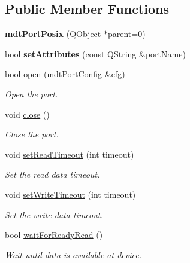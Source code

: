 \subsection*{Public Member Functions}
\begin{DoxyCompactItemize}
\item 
\hypertarget{classmdt_port_posix_ac122e8dde0e224afb3557d29a62de114}{
{\bfseries mdtPortPosix} (QObject $\ast$parent=0)}
\label{classmdt_port_posix_ac122e8dde0e224afb3557d29a62de114}

\item 
\hypertarget{classmdt_port_posix_a32a532f5148226da19ee4acc6ec63201}{
bool {\bfseries setAttributes} (const QString \&portName)}
\label{classmdt_port_posix_a32a532f5148226da19ee4acc6ec63201}

\item 
bool \hyperlink{classmdt_port_posix_aba7e87cb2423bfd61a248cc5d23a8517}{open} (\hyperlink{classmdt_port_config}{mdtPortConfig} \&cfg)
\begin{DoxyCompactList}\small\item\em Open the port. \end{DoxyCompactList}\item 
void \hyperlink{classmdt_port_posix_a778c8d4f6fadd1da725f4287af38f7f0}{close} ()
\begin{DoxyCompactList}\small\item\em Close the port. \end{DoxyCompactList}\item 
void \hyperlink{classmdt_port_posix_a7ab7e4a7dccbd58702f2c37335b900c8}{setReadTimeout} (int timeout)
\begin{DoxyCompactList}\small\item\em Set the read data timeout. \end{DoxyCompactList}\item 
void \hyperlink{classmdt_port_posix_a577a51bf0373f478b32bb1c1e5c4726c}{setWriteTimeout} (int timeout)
\begin{DoxyCompactList}\small\item\em Set the write data timeout. \end{DoxyCompactList}\item 
bool \hyperlink{classmdt_port_posix_a5547db404f974f1a04ba2e303b0aaed0}{waitForReadyRead} ()
\begin{DoxyCompactList}\small\item\em Wait until data is available at device. \end{DoxyCompactList}\item 

\end{DoxyCompactItemize}
